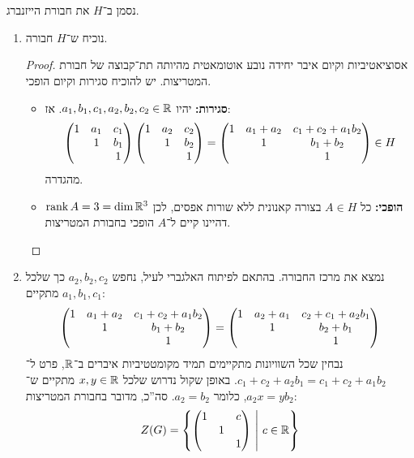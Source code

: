 \documentclass[]{../../../../../tex/classes/homework}
\begin{document}
	\section{}
	נסמן ב־$H$ את חבורת הייזנברג. 
	\begin{enumerate}
		\item נוכיח ש־$H$ חבורה. \begin{proof}
			אסוציאטיביות וקיום איבר יחידה נובע אוטומאטית מהיותה תת־קבוצה של חבורת המטריצות. יש להוכיח סגירות וקיום הופכי. 
			\begin{itemize}
				\item \textbf{סגירות: }יהיו $a_1, b_1, c_1, a_2, b_2, c_2 \in \mathbb{R}$. אז: 
				\[ \begin{pmatrix} 1 & a_1 & c_1 \\ & 1 & b_1 \\ & & 1 \end{pmatrix}\begin{pmatrix} 1 & a_2 & c_2 \\ & 1 & b_2 \\ & & 1 \end{pmatrix} = \begin{pmatrix} 1 & a_1 + a_2 & c_1 + c_2 + a_1b_2 \\  & 1 &b_1 + b_2 \\ & & 1 \end{pmatrix} \in H \]
				מהגדרה. 
				\item \textbf{הופכי: }כל $A \in H$ בצורה קאנונית ללא שורות אפסים, לכן $\operatorname{rank} A = 3 = \dim \mathbb{R}^{3}$ דהיינו קיים ל־$A$ הופכי בחבורת המטריצות. 
			\end{itemize}
		\end{proof}
		\item נמצא את מרכז החבורה. בהתאם לפיתוח האלגברי לעיל, נחפש $a_2, b_2, c_2$ כך שלכל $a_1, b_1, c_1$ מתקיים: 
		\[ \begin{pmatrix} 1 & a_1 + a_2 & c_1 + c_2 + a_1b_2 \\  & 1 &b_1 + b_2 \\ & & 1 \end{pmatrix} = \begin{pmatrix} 1 & a_2 + a_1 & c_2 + c_1 + a_2b_1 \\  & 1 &b_2 + b_1 \\ & & 1 \end{pmatrix} \]
		נבחין שכל השוויונות מתקיימים תמיד מקומטטיביות איברים ב־$\mathbb{R}$, פרט ל־$c_1 + c_2 + a_2b_1 = c_1 + c_2 + a_1b_2$. באופן שקול נדרוש שלכל $x, y \in \mathbb{R} $ מתקיים ש־$a_2x = yb_2$, כלומר $a_2 = b_2$. סה''כ, מדובר בחבורת המטריצות: 
		\[ Z(G) = \ccb{\pms{1 &  & c \\  & 1 &  \\ && 1} \ \middle\vert \ c \in \R} \]
	\end{enumerate}
	
\end{document}
